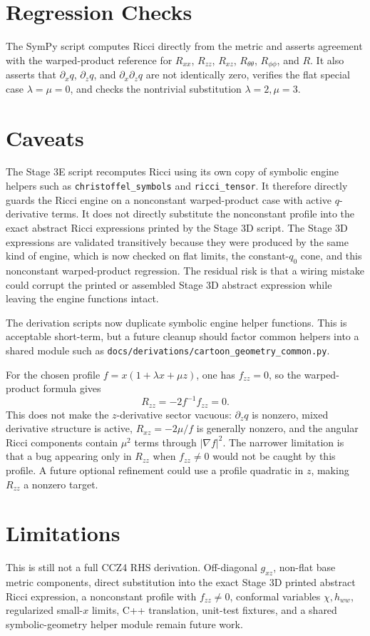 \documentclass[11pt]{article}
\begin{document}
\section{Regression Checks}

The SymPy script computes Ricci directly from the metric and asserts agreement
with the warped-product reference for \(R_{xx}\), \(R_{zz}\), \(R_{xz}\),
\(R_{\theta\theta}\), \(R_{\phi\phi}\), and \(R\). It also asserts that
\(\partial_x q\), \(\partial_z q\), and \(\partial_x\partial_z q\) are not
identically zero, verifies the flat special case \(\lambda=\mu=0\), and checks
the nontrivial substitution \(\lambda=2,\mu=3\).

\section{Caveats}

The Stage 3E script recomputes Ricci using its own copy of symbolic engine
helpers such as \texttt{christoffel\_symbols} and \texttt{ricci\_tensor}. It
therefore directly guards the Ricci engine on a nonconstant warped-product case
with active \(q\)-derivative terms. It does not directly substitute the
nonconstant profile into the exact abstract Ricci expressions printed by the
Stage 3D script. The Stage 3D expressions are validated transitively because
they were produced by the same kind of engine, which is now checked on flat
limits, the constant-\(q_0\) cone, and this nonconstant warped-product
regression. The residual risk is that a wiring mistake could corrupt the
printed or assembled Stage 3D abstract expression while leaving the engine
functions intact.

The derivation scripts now duplicate symbolic engine helper functions. This is
acceptable short-term, but a future cleanup should factor common helpers into a
shared module such as \texttt{docs/derivations/cartoon\_geometry\_common.py}.

For the chosen profile \(f=x(1+\lambda x+\mu z)\), one has \(f_{zz}=0\), so the
warped-product formula gives
\begin{equation}
  R_{zz}=-2f^{-1}f_{zz}=0.
\end{equation}
This does not make the \(z\)-derivative sector vacuous: \(\partial_z q\) is
nonzero, mixed derivative structure is active, \(R_{xz}=-2\mu/f\) is generally
nonzero, and the angular Ricci components contain \(\mu^2\) terms through
\(|\nabla f|^2\). The narrower limitation is that a bug appearing only in
\(R_{zz}\) when \(f_{zz}\ne0\) would not be caught by this profile. A future
optional refinement could use a profile quadratic in \(z\), making \(R_{zz}\)
a nonzero target.

\section{Limitations}

This is still not a full CCZ4 RHS derivation. Off-diagonal \(g_{xz}\),
non-flat base metric components, direct substitution into the exact Stage 3D
printed abstract Ricci expression, a nonconstant profile with \(f_{zz}\ne0\),
conformal variables \(\chi,h_{ww}\), regularized small-\(x\) limits, C++
translation, unit-test fixtures, and a shared symbolic-geometry helper module
remain future work.
\end{document}
